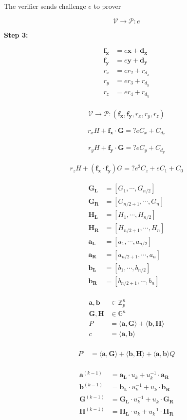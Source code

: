 \documentclass{article}
\newcommand{\eq}[1]{\begin{equation*}\begin{split}#1\end{split}\end{equation*}}
\renewcommand{\vec}[1]{\mathbf{#1}}
\newcommand{\V}{\mathcal{V}}
\renewcommand{\P}{\mathcal{P}}
\newcommand{\G}{\mathbb{G}}
\newcommand{\Z}{\mathbb{Z}}
\newcommand{\dotp}[2]{\langle #1, #2 \rangle}
\begin{document}
The verifier sends challenge $e$ to prover

$$\V \rightarrow \P: e$$

\textbf{Step 3:}

\eq{
	\vec{f_x} &= e \vec{x} + \vec{d_x} \\
	\vec{f_y} &= e \vec{y} + \vec{d_y} \\
	r_x &= e r_2 + r_{d_x} \\
	r_y &= e r_3 + r_{d_y} \\
	r_z &= e r_4 + r_{d_y} \\
}

$$\V \rightarrow \P: (\vec{f_x}, \vec{f_y}, r_x, r_y, r_z)$$

\eq{
	r_x H + \vec{f_x \cdot G} =? e C_x + C_{d_x}
}

\eq{
	r_y H + \vec{f_y \cdot G} =? e C_y + C_{d_y}
}

\eq{
	r_z H + (\vec{f_x \cdot f_y}) G =? e^2 C_z + e C_1 + C_0
}

\eq{
	\vec{G_L} &= [G_{1}, \cdots, G_{n/2}] \\
	\vec{G_R} &= [G_{n/2+1}, \cdots, G_{n}] \\
	\vec{H_L} &= [H_{1}, \cdots, H_{n/2}] \\
	\vec{H_R} &= [H_{n/2+1}, \cdots, H_{n}] \\
	\vec{a_L} &= [a_{1}, \cdots, a_{n/2}] \\
	\vec{a_R} &= [a_{n/2+1}, \cdots, a_{n}] \\
	\vec{b_L} &= [b_{1}, \cdots, b_{n/2}] \\
	\vec{b_R} &= [b_{n/2+1}, \cdots, b_{n}] \\
}

\eq{
	\vec{a}, \vec{b} &\in \Z^n_p \\
	\vec{G}, \vec{H} &\in \G^n \\
	P &= \dotp{\vec{a}}{\vec{G}} + \dotp{\vec{b}}{\vec{H}} \\
	c &= \dotp{\vec{a}}{\vec{b}} \\
}

\eq{
	P' &= \dotp{\vec{a}}{\vec{G}} + \dotp{\vec{b}}{\vec{H}} + \dotp{\vec{a}}{\vec{b}}Q \\
}

\eq{
	\vec{a}^{(k-1)} &= \vec{a_{L}} \cdot u_k      + u^{-1}_k \cdot \vec{a_R} \\
	\vec{b}^{(k-1)} &= \vec{b_{L}} \cdot u^{-1}_k + u_k      \cdot \vec{b_R} \\
	\vec{G}^{(k-1)} &= \vec{G_{L}} \cdot u^{-1}_k + u_k      \cdot \vec{G_R} \\
	\vec{H}^{(k-1)} &= \vec{H_{L}} \cdot u_k      + u^{-1}_k \cdot \vec{H_R} \\
}
\end{document}
